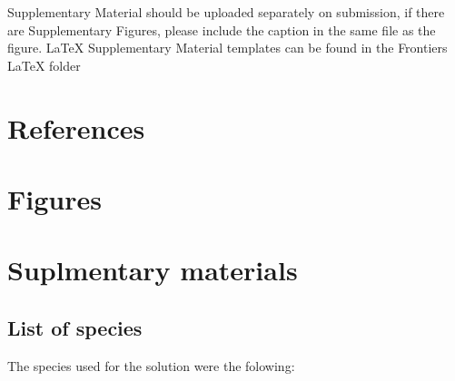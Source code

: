 \documentclass[]{article}
\begin{document}
Supplementary Material should be uploaded separately on submission, if there are
Supplementary Figures, please include the caption in the same file as the
figure. LaTeX Supplementary Material templates can be found in the Frontiers
LaTeX folder

\hypertarget{references}{%
\section{References}\label{references}}

\hypertarget{figures}{%
\section*{Figures}\label{figures}}

\hypertarget{suplmentary-materials}{%
\section{Suplmentary materials}\label{suplmentary-materials}}

\hypertarget{list-of-species}{%
\subsection{List of species}\label{list-of-species}}

The species used for the solution were the folowing:
\end{document}

